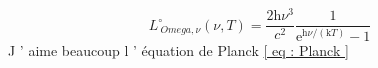 \begin {equation}
  L _{\ Omega ,\nu }^{\circ } (\nu ,T ) =\frac {2\mathrm { h } \nu ^{3}}{
    c ^{2}} \frac {1}{\mathrm { e } ^{\mathrm { h } \nu /(\mathrm { k }
    T ) } -1}
  \label { eq : Planck } %
\end {equation}
J ’ aime beaucoup l ’ équation de Planck \ref{ eq : Planck }
